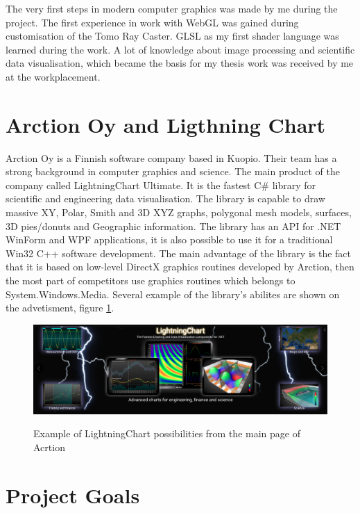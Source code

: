 \documentclass[twoside, english, 11pt]{report}
\begin{document}
The very first steps in modern computer graphics was made by me during the project. The first experience in work with WebGL was gained during customisation of the Tomo Ray Caster. GLSL as my first shader language was learned during the work. A lot of knowledge about image processing and scientific data visualisation, which became the basis for my thesis work was received by me at the workplacement.


\section{Arction Oy and Ligthning Chart}

Arction Oy is a Finnish software company based in Kuopio. Their team has a strong background in computer graphics and science. The main product of the company called LightningChart Ultimate. It is the fastest C\# library for scientific and engineering data visualisation. The library is capable to draw massive XY, Polar, Smith and 3D XYZ graphs, polygonal mesh models, surfaces, 3D pies/donuts and Geographic information. The library has an API for .NET WinForm and WPF applications, it is also possible to use it for a traditional Win32 C++ software development. The main advantage of the library is the fact that it is based on low-level DirectX graphics routines developed by Arction, then the most part of competitors use graphics routines which belongs to System.Windows.Media. Several example of the library's abilites are shown on the advetisment, figure \ref{fig:lchu}.\\
\begin{figure}[!h]
\includegraphics[scale=0.33]{img/lchu}\\
\caption{Example of LightningChart possibilities from the main page of Acrtion\label{fig:lchu}}
\end{figure}

\section{Project Goals}
\end{document}
